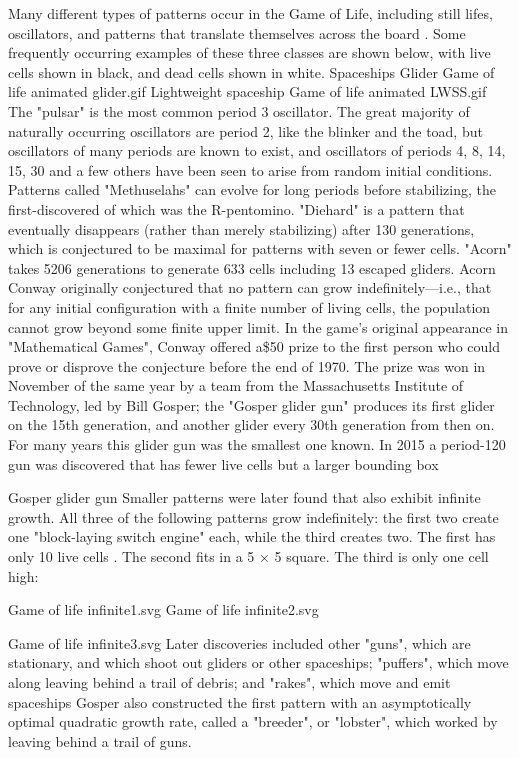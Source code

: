 Many different types of patterns occur in the Game of Life, including still lifes, oscillators, and patterns that translate themselves across the board . Some frequently occurring examples of these three classes are shown below, with live cells shown in black, and dead cells shown in white.
Spaceships
Glider	Game of life animated glider.gif
Lightweight spaceship 	Game of life animated LWSS.gif
The "pulsar" is the most common period 3 oscillator. The great majority of naturally occurring oscillators are period 2, like the blinker and the toad, but oscillators of many periods are known to exist, and oscillators of periods 4, 8, 14, 15, 30 and a few others have been seen to arise from random initial conditions. Patterns called "Methuselahs" can evolve for long periods before stabilizing, the first-discovered of which was the R-pentomino. "Diehard" is a pattern that eventually disappears (rather than merely stabilizing) after 130 generations, which is conjectured to be maximal for patterns with seven or fewer cells. "Acorn" takes 5206 generations to generate 633 cells including 13 escaped gliders.
Acorn
Conway originally conjectured that no pattern can grow indefinitely—i.e., that for any initial configuration with a finite number of living cells, the population cannot grow beyond some finite upper limit. In the game's original appearance in "Mathematical Games", Conway offered a\$50 prize to the first person who could prove or disprove the conjecture before the end of 1970. The prize was won in November of the same year by a team from the Massachusetts Institute of Technology, led by Bill Gosper; the "Gosper glider gun" produces its first glider on the 15th generation, and another glider every 30th generation from then on. For many years this glider gun was the smallest one known. In 2015 a period-120 gun was discovered that has fewer live cells but a larger bounding box


Gosper glider gun
Smaller patterns were later found that also exhibit infinite growth. All three of the following patterns grow indefinitely: the first two create one "block-laying switch engine" each, while the third creates two. The first has only 10 live cells . The second fits in a 5 × 5 square. The third is only one cell high:

Game of life infinite1.svg     Game of life infinite2.svg

Game of life infinite3.svg
Later discoveries included other "guns", which are stationary, and which shoot out gliders or other spaceships; "puffers", which move along leaving behind a trail of debris; and "rakes", which move and emit spaceships Gosper also constructed the first pattern with an asymptotically optimal quadratic growth rate, called a "breeder", or "lobster", which worked by leaving behind a trail of guns.

